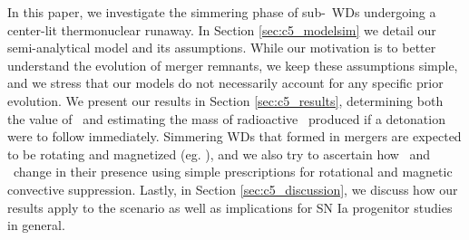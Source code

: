 In this paper, we investigate the simmering phase of sub-\Mch\ WDs undergoing a center-lit thermonuclear runaway.  In Section \ref{sec:c5_modelsim} we detail our semi-analytical model and its assumptions.  While our motivation is to better understand the evolution of merger remnants, we keep these assumptions simple, and we stress that our models do not necessarily account for any specific prior evolution.  We present our results in Section \ref{sec:c5_results}, determining both the value of \Mcrit\ and estimating the mass of radioactive \Ni\ produced if a detonation were to follow immediately.  Simmering WDs that formed in mergers are expected to be rotating and magnetized (eg. \citealt{wicktf14, zhu+15}), and we also try to ascertain how \Mcrit\ and \MNi\ change in their presence using simple prescriptions for rotational and magnetic convective suppression.  Lastly, in Section \ref{sec:c5_discussion}, we discuss how our results apply to the \citeal{vkercj10} scenario as well as implications for SN Ia progenitor studies in general.
